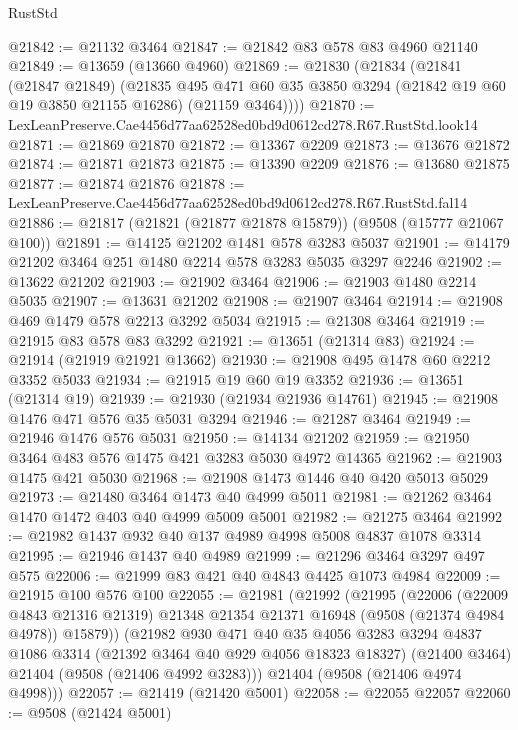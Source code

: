 \begin{lexlean}{RustStd}
\begin{coremodule}
@21842 := @21132 @3464
@21847 := @21842 @83 @578 @83 @4960 @21140
@21849 := @13659 (@13660 @4960)
@21869 := @21830
    (@21834
      (@21841
        (@21847 @21849)
        (@21835
          @495
          @471
          @60
          @35
          @3850
          @3294
          (@21842 @19 @60 @19 @3850 @21155 @16286)
          (@21159 @3464))))
@21870 := LexLeanPreserve.Cae4456d77aa62528ed0bd9d0612cd278.R67.RustStd.look14
@21871 := @21869 @21870
@21872 := @13367 @2209
@21873 := @13676 @21872
@21874 := @21871 @21873
@21875 := @13390 @2209
@21876 := @13680 @21875
@21877 := @21874 @21876
@21878 := LexLeanPreserve.Cae4456d77aa62528ed0bd9d0612cd278.R67.RustStd.fal14
@21886 := @21817 (@21821 (@21877 @21878 @15879)) (@9508 (@15777 @21067 @100))
@21891 := @14125 @21202 @1481 @578 @3283 @5037
@21901 := @14179 @21202 @3464 @251 @1480 @2214 @578 @3283 @5035 @3297 @2246
@21902 := @13622 @21202
@21903 := @21902 @3464
@21906 := @21903 @1480 @2214 @5035
@21907 := @13631 @21202
@21908 := @21907 @3464
@21914 := @21908 @469 @1479 @578 @2213 @3292 @5034
@21915 := @21308 @3464
@21919 := @21915 @83 @578 @83 @3292
@21921 := @13651 (@21314 @83)
@21924 := @21914 (@21919 @21921 @13662)
@21930 := @21908 @495 @1478 @60 @2212 @3352 @5033
@21934 := @21915 @19 @60 @19 @3352
@21936 := @13651 (@21314 @19)
@21939 := @21930 (@21934 @21936 @14761)
@21945 := @21908 @1476 @471 @576 @35 @5031 @3294
@21946 := @21287 @3464
@21949 := @21946 @1476 @576 @5031
@21950 := @14134 @21202
@21959 := @21950 @3464 @483 @576 @1475 @421 @3283 @5030 @4972 @14365
@21962 := @21903 @1475 @421 @5030
@21968 := @21908 @1473 @1446 @40 @420 @5013 @5029
@21973 := @21480 @3464 @1473 @40 @4999 @5011
@21981 := @21262 @3464 @1470 @1472 @403 @40 @4999 @5009 @5001
@21982 := @21275 @3464
@21992 := @21982 @1437 @932 @40 @137 @4989 @4998 @5008 @4837 @1078 @3314
@21995 := @21946 @1437 @40 @4989
@21999 := @21296 @3464 @3297 @497 @575
@22006 := @21999 @83 @421 @40 @4843 @4425 @1073 @4984
@22009 := @21915 @100 @576 @100
@22055 := @21981
    (@21992
      (@21995
        (@22006
          (@22009 @4843 @21316 @21319)
          @21348
          @21354
          @21371
          @16948
          (@9508 (@21374 @4984 @4978))
          @15879))
      (@21982
        @930
        @471
        @40
        @35
        @4056
        @3283
        @3294
        @4837
        @1086
        @3314
        (@21392 @3464 @40 @929 @4056 @18323 @18327)
        (@21400 @3464)
        @21404
        (@9508 (@21406 @4992 @3283)))
      @21404
      (@9508 (@21406 @4974 @4998)))
@22057 := @21419 (@21420 @5001)
@22058 := @22055 @22057
@22060 := @9508 (@21424 @5001)

\end{coremodule}
\end{lexlean}
